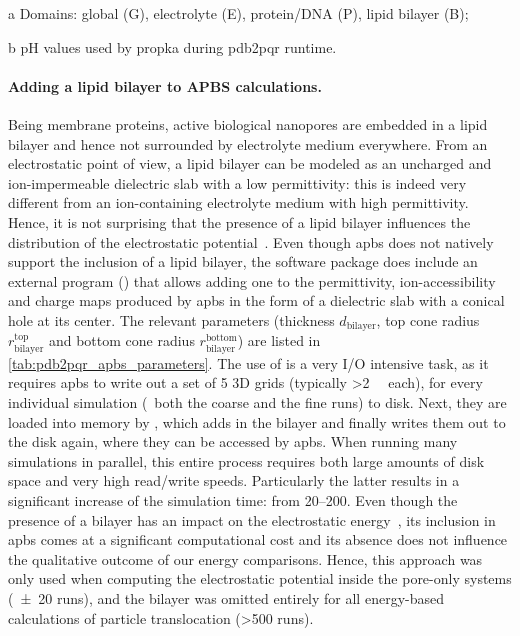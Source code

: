 {\begin{landscape}
\begin{threeparttable}[p]
    \begin{tablenotes}
     \item[a] Domains: global (G), electrolyte (E), protein/DNA (P), lipid bilayer (B);
     \item[b] pH values used by \gls{propka} during \gls{pdb2pqr} runtime.
    \end{tablenotes}
  
  \end{threeparttable}
\end{landscape}
}
%
%

\paragraph{Adding a lipid bilayer to APBS calculations.}
%
Being membrane proteins, active biological nanopores are embedded in a lipid bilayer and hence not surrounded
by electrolyte medium everywhere. From an electrostatic point of view, a lipid bilayer can be modeled as an
uncharged and ion-impermeable dielectric slab with a low permittivity: this is indeed very different from an
ion-containing electrolyte medium with high permittivity. Hence, it is not surprising that the presence of a
lipid bilayer influences the distribution of the electrostatic potential~\cite{Homeyer-2015}. Even though
\Gls{apbs} does not natively support the inclusion of a lipid bilayer, the software package does include an
external program () that allows adding one to the permittivity, ion-accessibility and
charge maps produced by \gls{apbs} in the form of a dielectric slab with a conical hole at its center. The
relevant parameters (thickness $d_{\textrm{bilayer}}$, top cone radius $r_{\textrm{bilayer}}^{\textrm{top}}$
and bottom cone radius $r_{\textrm{bilayer}}^{\textrm{bottom}}$) are listed in
\cref{tab:pdb2pqr_apbs_parameters}. The use of  is a very I/O intensive task, as it
requires \gls{apbs} to write out a set of 5 3D grids (typically \SI{>2}{\gibi\byte} each), for every
individual simulation (\ie~both the coarse and the fine runs) to disk. Next, they are loaded into memory by
, which adds in the bilayer and finally writes them out to the disk again, where they
can be accessed by \gls{apbs}. When running many simulations in parallel, this entire process requires both
large amounts of disk space and very high read/write speeds. Particularly the latter results in a significant
increase of the simulation time: from \SIrange{20}{200}{\min}. Even though the presence of a bilayer has an
impact on the electrostatic energy~\cite{Bonthuis-2006}, its inclusion in \gls{apbs} comes at a significant
computational cost and its absence does not influence the qualitative outcome of our energy comparisons.
Hence, this approach was only used when computing the electrostatic potential inside the pore-only systems
(\num{\pm20} runs), and the bilayer was omitted entirely for all energy-based calculations of particle
translocation (\num{>500} runs).  


